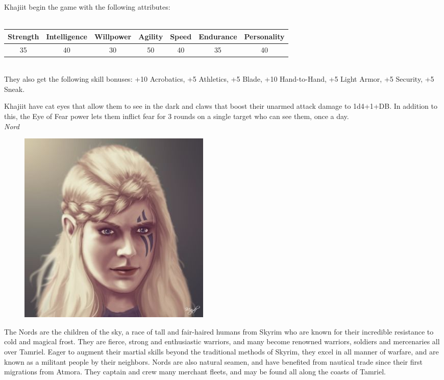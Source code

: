 \documentclass[12pt]{article}
\begin{document}
Khajiit begin the game with the following attributes:\\~\\
\begin{tabular}{|c|c|c|c|c|c|c|}
\hline
Strength & Intelligence & Willpower & Agility & Speed & Endurance & Personality\\ \hline
35 & 40 & 30 & 50 & 40 & 35 & 40\\ \hline

\end{tabular}\\

They also get the following skill bonuses: +10 Acrobatics, +5 Athletics, +5 Blade, +10 Hand-to-Hand, +5 Light Armor, +5 Security, +5 Sneak.

Khajiit have cat eyes that allow them to see in the dark and claws that boost their unarmed attack damage to 1d4+1+DB. In addition to this, the Eye of Fear power lets them inflict fear for 3 rounds on a single target who can see them, once a day.\\

\noindent
\textit{Nord}
\begin{figure}
	\includegraphics[width=\textwidth]{Nord.png}
\end{figure}

The Nords are the children of the sky, a race of tall and fair-haired humans from Skyrim who are known for their incredible resistance to cold and magical frost. They are fierce, strong and enthusiastic warriors, and many become renowned warriors, soldiers and mercenaries all over Tamriel. Eager to augment their martial skills beyond the traditional methods of Skyrim, they excel in all manner of warfare, and are known as a militant people by their neighbors. Nords are also natural seamen, and have benefited from nautical trade since their first migrations from Atmora. They captain and crew many merchant fleets, and may be found all along the coasts of Tamriel.
\end{document}
